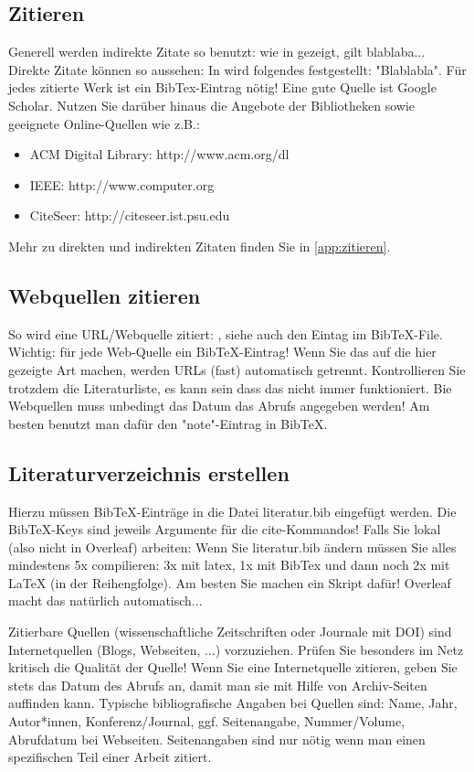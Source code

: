 \documentclass[12pt,oneside]{article}
\begin{document}
\subsection{Zitieren}\label{sec:zitate}
Generell werden indirekte Zitate so benutzt: wie in \cite{clemen1989combining} gezeigt, gilt blablaba...
Direkte Zitate können so aussehen: In \cite{gilabert2006intelligent} wird folgendes festgestellt: "Blablabla". 
Für jedes zitierte Werk ist ein BibTex-Eintrag nötig! Eine gute Quelle ist Google Scholar. Nutzen Sie darüber hinaus die Angebote der Bibliotheken sowie geeignete Online-Quellen wie z.B.:
\begin{itemize}
\item ACM Digital Library: http://www.acm.org/dl
\item IEEE: http://www.computer.org
\item  CiteSeer: http://citeseer.ist.psu.edu
\end{itemize}
Mehr zu direkten und indirekten Zitaten finden Sie in \ref{app:zitieren}.

\subsection{Webquellen zitieren}\label{sec:webquellen}
So wird eine URL/Webquelle zitiert: \cite{shiny1}, siehe auch den Eintag im BibTeX-File.
Wichtig: für jede Web-Quelle ein BibTeX-Eintrag! Wenn Sie das auf die hier gezeigte Art machen, werden URLs (fast) automatisch getrennt. Kontrollieren Sie trotzdem die Literaturliste, es kann sein dass das nicht immer funktioniert. Bie Webquellen muss unbedingt das Datum das Abrufs angegeben werden! Am besten benutzt man dafür den "note"-Eintrag in BibTeX.

\subsection{Literaturverzeichnis erstellen}
Hierzu müssen BibTeX-Einträge in die Datei literatur.bib eingefügt werden. Die BibTeX-Keys sind jeweils Argumente für die cite-Kommandos! Falls Sie lokal (also nicht in Overleaf) arbeiten: Wenn Sie literatur.bib ändern müssen Sie alles mindestens 5x compilieren: 3x mit latex, 1x mit BibTex und dann noch 2x mit LaTeX (in der Reihengfolge). Am besten Sie machen ein Skript dafür! Overleaf macht das natürlich automatisch...

Zitierbare Quellen (wissenschaftliche Zeitschriften oder Journale mit DOI) sind Internetquellen (Blogs, Webseiten, ...) vorzuziehen. Prüfen Sie besonders im Netz kritisch die Qualität der Quelle! Wenn Sie eine Internetquelle zitieren, geben Sie stets das Datum des Abrufs an, damit man sie mit Hilfe von Archiv-Seiten auffinden kann. Typische bibliografische Angaben bei Quellen sind: 
Name, Jahr, Autor*innen, Konferenz/Journal, ggf. Seitenangabe, Nummer/Volume, Abrufdatum bei Webseiten. Seitenangaben sind nur nötig wenn man einen spezifischen Teil einer Arbeit zitiert.
\end{document}

